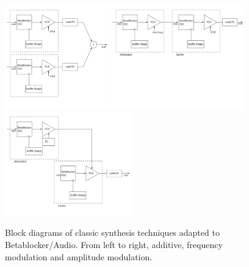 \documentclass[letterpaper, 12pt]{article}
\begin{document}
\begin{figure}
	\centering
		\includegraphics[height=4.5cm]{Additive-Betablocker}
		\includegraphics[height=4.5cm]{FM-Betablocker}
		\includegraphics[height=4.5cm]{AM-Betablocker}
	\caption{Block diagrams of classic synthesis techniques adapted to Betablocker/Audio. From left to right, additive, frequency modulation and amplitude modulation.}
	\label{fig:classicSynthesisTechniquesFMAMAdditive}
\end{figure}
\end{document}

